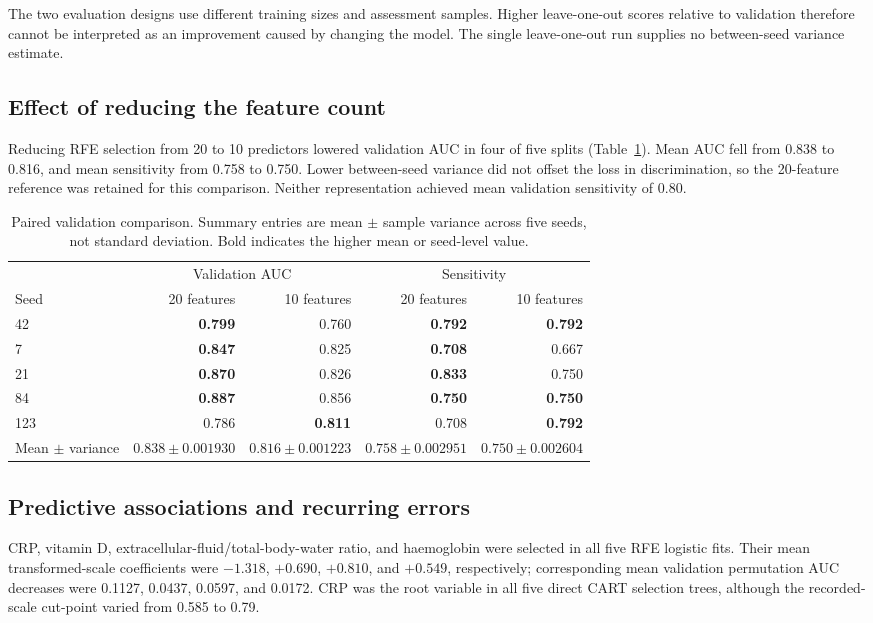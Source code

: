 The two evaluation designs use different training sizes and assessment samples. Higher leave-one-out scores relative to validation therefore cannot be interpreted as an improvement caused by changing the model. The single leave-one-out run supplies no between-seed variance estimate.

\subsection{Effect of reducing the feature count}
Reducing RFE selection from 20 to 10 predictors lowered validation AUC in four of five splits (Table~\ref{tab:iteration-summary}). Mean AUC fell from 0.838 to 0.816, and mean sensitivity from 0.758 to 0.750. Lower between-seed variance did not offset the loss in discrimination, so the 20-feature reference was retained for this comparison. Neither representation achieved mean validation sensitivity of 0.80.

\begin{table}[htbp]
\centering
\footnotesize
\caption{Paired validation comparison. Summary entries are mean $\pm$ sample variance across five seeds, not standard deviation. Bold indicates the higher mean or seed-level value.}
\label{tab:iteration-summary}
\begin{tabular}{lrrrr}
\toprule
& \multicolumn{2}{c}{Validation AUC} & \multicolumn{2}{c}{Sensitivity} \\
Seed & 20 features & 10 features & 20 features & 10 features \\
\midrule
42  & \textbf{0.799} & 0.760 & \textbf{0.792} & \textbf{0.792} \\
7   & \textbf{0.847} & 0.825 & \textbf{0.708} & 0.667 \\
21  & \textbf{0.870} & 0.826 & \textbf{0.833} & 0.750 \\
84  & \textbf{0.887} & 0.856 & \textbf{0.750} & \textbf{0.750} \\
123 & 0.786 & \textbf{0.811} & 0.708 & \textbf{0.792} \\
\midrule
Mean $\pm$ variance &
$\mathbf{0.838}\pm0.001930$ & $0.816\pm0.001223$ &
$\mathbf{0.758}\pm0.002951$ & $0.750\pm0.002604$ \\
\bottomrule
\end{tabular}
\end{table}
\subsection{Predictive associations and recurring errors}
CRP, vitamin D, extracellular-fluid/total-body-water ratio, and haemoglobin were selected in all five RFE logistic fits. Their mean transformed-scale coefficients were $-1.318$, $+0.690$, $+0.810$, and $+0.549$, respectively; corresponding mean validation permutation AUC decreases were 0.1127, 0.0437, 0.0597, and 0.0172. CRP was the root variable in all five direct CART selection trees, although the recorded-scale cut-point varied from 0.585 to 0.79.

